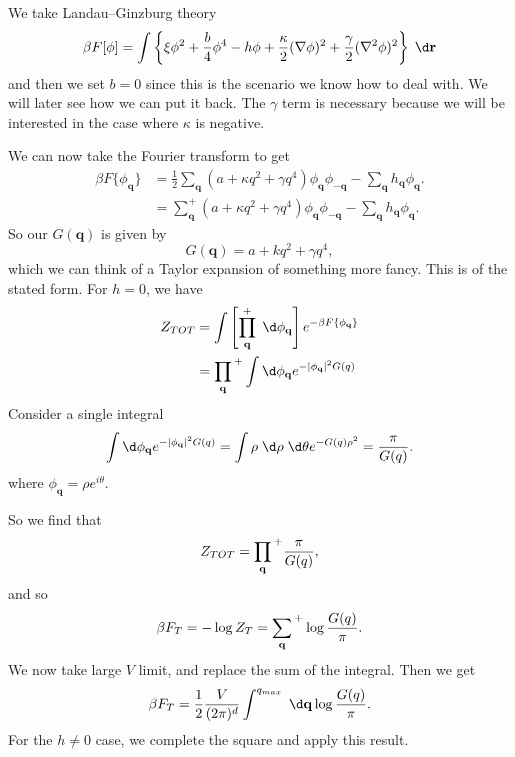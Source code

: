 \documentclass[a4paper]{article}
\begin{document}
\begin{eg}
  We take Landau--Ginzburg theory
  \[
    \beta F[\phi] = \int \left\{\xi \phi^2 + \frac{b}{4} \phi^4 - h \phi + \frac{\kappa}{2} (\nabla \phi)^2 + \frac{\gamma}{2} (\nabla^2 \phi)^2\right\}\;\d \mathbf{r}
  \]
  and then we set $b = 0$ since this is the scenario we know how to deal with. We will later see how we can put it back. The $\gamma$ term is necessary because we will be interested in the case where $\kappa$ is negative.

  We can now take the Fourier transform to get
  \begin{align*}
    \beta F \{\phi_\mathbf{q}\} &= \frac{1}{2} \sum_\mathbf{q} (a + \kappa q^2 + \gamma q^4) \phi_\mathbf{q} \phi_{-\mathbf{q}} - \sum_\mathbf{q} h_\mathbf{q} \phi_\mathbf{q}.\\
    &= \sum_\mathbf{q}^+ (a + \kappa q^2 + \gamma q^4) \phi_\mathbf{q} \phi_{-\mathbf{q}} - \sum_\mathbf{q} h_\mathbf{q} \phi_\mathbf{q}.
  \end{align*}
  So our $G(\mathbf{q})$ is given by
  \[
    G(\mathbf{q}) = a + k q^2 + \gamma q^4,
  \]
  which we can think of a Taylor expansion of something more fancy. This is of the stated form. For $h = 0$, we have
  \begin{align*}
    Z_{TOT} &= \int \left[ \prod_{\mathbf{q}}^+ \;\d \phi_\mathbf{q}\right] e^{-\beta F\{\phi_\mathbf{q}\}}\\
    &= \prod_\mathbf{q}{\vphantom{\prod}}^+ \int \d \phi_\mathbf{q} e^{-|\phi_\mathbf{q}|^2 G(q)}
  \end{align*}
  Consider a single integral
  \[
    \int \d \phi_\mathbf{q} e^{-|\phi_\mathbf{q}|^2 G(q)} = \int \rho \;\d \rho \;\d \theta e^{-G(q) \rho^2} = \frac{\pi}{G(q)}.
  \]
  where $\phi_\mathbf{q} = \rho e^{i\theta}$.

  So we find that
  \[
    Z_{TOT} = \prod_\mathbf{q}{\vphantom{\prod}}^+ \frac{\pi}{G(q)},
  \]
  and so
  \[
    \beta F_T = -\log Z_T = \sum_\mathbf{q}{\vphantom{\sum}}^+ \log \frac{G(q)}{\pi}.
  \]
  We now take large $V$ limit, and replace the sum of the integral. Then we get
  \[
    \beta F_T = \frac{1}{2} \frac{V}{(2\pi)^d} \int^{q_{max}} \;\d \mathbf{q} \log \frac{G(q)}{\pi}.
  \]
  For the $h \not= 0$ case, we complete the square and apply this result.
\end{eg}
\end{document}
